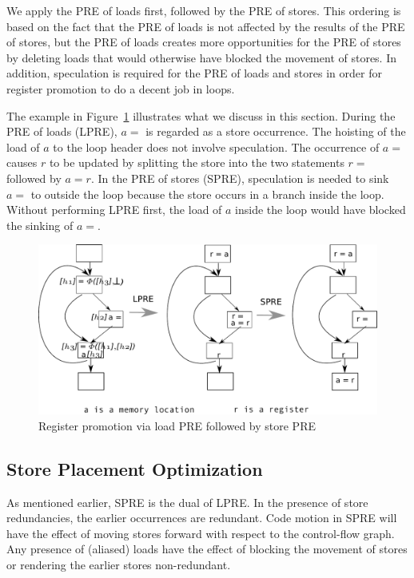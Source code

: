 We apply the PRE of loads
first, followed by the PRE of stores.  This ordering is based on the fact that
the PRE of loads is not affected by the results of the PRE of stores, but the
PRE of loads creates more opportunities for the PRE of stores by deleting
loads that would otherwise have blocked the movement of stores.  In addition,
speculation is required for the PRE of loads and stores in order for register
promotion to do a decent job in loops.  

The example in Figure~\ref{fig: promotion-example} illustrates what we discuss
in this section.  During the PRE of loads (LPRE), $a =$ is regarded as a
store occurrence.  The hoisting of the load of $a$ to the loop header does
not involve speculation. The occurrence of $a =$ causes $r$ to be updated
by splitting the store into the two statements $r =$ followed by $a = r$.  In 
the PRE of stores (SPRE), speculation is needed to sink $a =$ to outside the
loop because the store occurs in a branch inside the loop.  Without performing 
LPRE first, the load of $a$ inside the loop would
have blocked the sinking of $a =$.

\begin{figure}
\centering
\includegraphics[scale=0.55]{fig-promotion-example.pdf}
\caption{Register promotion via load PRE followed by store PRE}
\label{fig: promotion-example}
\end{figure}

\subsection{Store Placement Optimization}

As mentioned earlier, SPRE is the dual of LPRE.
In the presence of store redundancies, the earlier occurrences are redundant.
Code motion in SPRE will have the effect of moving stores forward with respect 
to the control-flow graph.  Any presence of (aliased) loads have the effect of
blocking the movement of stores or rendering the earlier stores non-redundant.

